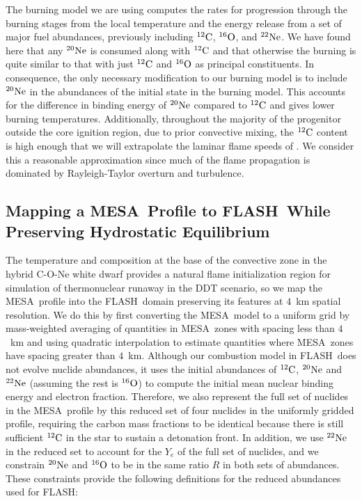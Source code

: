 \documentclass[iop,apj]{emulateapj}
\newcommand{\C}[1]{\ensuremath{{}^{#1}{\rm C}}}
\newcommand{\Ox}[1]{\ensuremath{{}^{#1}{\rm O}}}
\newcommand{\Ne}[1]{\ensuremath{{}^{#1}{\rm Ne}}}
\newcommand{\Mg}[1]{\ensuremath{{}^{#1}{\rm Mg}}}
\newcommand{\code}[1]{\textsc{#1}}
\newcommand{\FLASH}{\code{FLASH}}
\newcommand{\MESA}{\code{MESA}}
\begin{document}
The burning model we are using computes the rates for progression
through the burning stages from the local temperature and the energy
release from a set of major fuel abundances, previously including
\C{12}, \Ox{16}, and \Ne{22}. We have found here that any \Ne{20} is
consumed along with \C{12} and that otherwise the burning is quite
similar to that with just \C{12} and \Ox{16} as principal
constituents. In consequence, the only necessary modification to our
burning model is to include \Ne{20} in the abundances of the initial
state in the burning model. This accounts for the difference in
binding energy of \Ne{20} compared to \C{12} and gives lower burning
temperatures. Additionally, throughout the majority of the progenitor
outside the core ignition region, due to prior convective mixing, the
\C{12} content is high enough that we will extrapolate the laminar flame speeds of
\citet{timmes92,Chametal08}. We consider this a reasonable
approximation since much of the flame propagation is dominated by
Rayleigh-Taylor overturn and turbulence.

\subsection{Mapping a \MESA\ Profile to \FLASH\ While Preserving Hydrostatic Equilibrium}
\label{subsec:mesa_flash_mapping}
The temperature and composition at the base of the convective zone in
the hybrid C-O-Ne white dwarf provides a natural flame initialization
region for simulation of thermonuclear runaway in the DDT scenario, so
we map the \MESA\ profile into the \FLASH\ domain preserving its
features at $4$~km spatial resolution. We do this by first converting
the \MESA\ model to a uniform grid by mass-weighted averaging of
quantities in \MESA\ zones with spacing less than $4$~km and using
quadratic interpolation to estimate quantities where \MESA\ zones have
spacing greater than $4$~km. Although our combustion model in
\FLASH\ does not evolve nuclide abundances, it uses the initial
abundances of \C{12}, \Ne{20} and \Ne{22} (assuming the rest is \Ox{16}) to compute the
initial mean nuclear binding energy and electron fraction.
Therefore, we also represent the full set of nuclides in the
\MESA\ profile by this reduced set of four nuclides in the uniformly
gridded profile, requiring the carbon mass fractions to be identical
because there is still sufficient \C{12} in the star to sustain a
detonation front. In addition, we use \Ne{22} in the reduced set to
account for the $Y_e$ of the full set of nuclides, and we constrain
\Ne{20} and \Ox{16} to be in the same ratio $R$ in both sets of
abundances. These constraints provide the following definitions for
the reduced abundances used for \FLASH:
\end{document}

